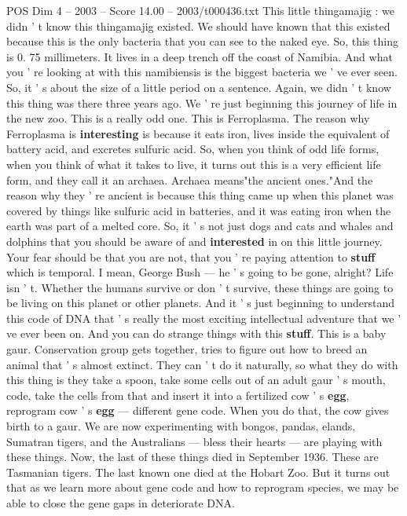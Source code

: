 \begin{textsample}{POS Dim 4 – 2003 – Score 14.00 – 2003/t000436.txt}
This little thingamajig : we didn ' t know this thingamajig existed.
We should have known that this existed because this is the only bacteria that you can see to the naked eye.
So, this thing is 0. 75 millimeters.
It lives in a deep trench off the coast of Namibia.
And what you ' re looking at with this namibiensis is the biggest bacteria we ' ve ever seen.
So, it ' s about the size of a little period on a sentence.
Again, we didn ' t know this thing was there three years ago.
We ' re just beginning this journey of life in the new zoo.
This is a really odd one.
This is Ferroplasma.
The reason why Ferroplasma is \textbf{interesting} is because it eats iron, lives inside the equivalent of battery acid, and excretes sulfuric acid.
So, when you think of odd life forms, when you think of what it takes to live, it turns out this is a very efficient life form, and they call it an archaea.
Archaea means"the ancient ones."And the reason why they ' re ancient is because this thing came up when this planet was covered by things like sulfuric acid in batteries, and it was eating iron when the earth was part of a melted core.
So, it ' s not just dogs and cats and whales and dolphins that you should be aware of and \textbf{interested} in on this little journey.
Your fear should be that you are not, that you ' re paying attention to \textbf{stuff} which is temporal.
I mean, George Bush — he ' s going to be gone, alright?
Life isn ' t.
Whether the humans survive or don ' t survive, these things are going to be living on this planet or other planets.
And it ' s just beginning to understand this code of DNA that ' s really the most exciting intellectual adventure that we ' ve ever been on.
And you can do strange things with this \textbf{stuff}.
This is a baby gaur.
Conservation group gets together, tries to figure out how to breed an animal that ' s almost extinct.
They can ' t do it naturally, so what they do with this thing is they take a spoon, take some cells out of an adult gaur ' s mouth, code, take the cells from that and insert it into a fertilized cow ' s \textbf{egg}, reprogram cow ' s \textbf{egg} — different gene code.
When you do that, the cow gives birth to a gaur.
We are now experimenting with bongos, pandas, elands, Sumatran tigers, and the Australians — bless their hearts — are playing with these things.
Now, the last of these things died in September 1936.
These are Tasmanian tigers.
The last known one died at the Hobart Zoo.
But it turns out that as we learn more about gene code and how to reprogram species, we may be able to close the gene gaps in deteriorate DNA.

\end{textsample}
